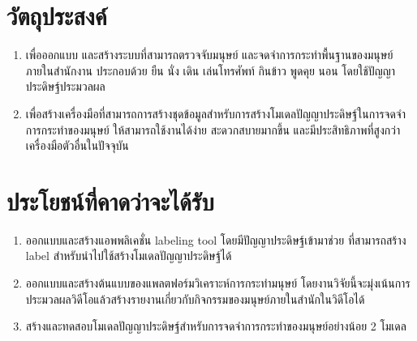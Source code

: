 \section{วัตถุประสงค์}
\begin{enumerate}
	\setlength\itemsep{-0.25em}
	\item เพื่อออกแบบ และสร้างระบบที่สามารถตรวจจับมนุษย์ และจดจำการกระทำพื้นฐานของมนุษย์ภายในสำนักงาน 
	ประกอบด้วย ยืน นั่ง เดิน เล่นโทรศัพท์ กินข้าว พูดคุย นอน โดยใช้ปัญญาประดิษฐ์ประมวลผล
	\item เพื่อสร้างเครื่องมือที่สามารถการสร้างชุดข้อมูลสำหรับการสร้างโมเดลปัญญาประดิษฐ์ในการจดจำการกระทำของมนุษย์ ให้สามารถใช้งานได้ง่าย 
	สะดวกสบายมากขึ้น และมีประสิทธิภาพที่สูงกว่าเครื่องมือตัวอื่นในปัจจุบัน
\end{enumerate}


\section{ประโยชน์ที่คาดว่าจะได้รับ}
\begin{enumerate}
	\setlength\itemsep{-0.25em}
	\item ออกแบบและสร้างแอพพลิเคชั่น labeling tool โดยมีปัญญาประดิษฐ์เข้ามาช่วย ที่สามารถสร้าง label สำหรับนำไปใช้สร้างโมเดลปัญญาประดิษฐ์ได้
	\item ออกแบบและสร้างต้นแบบของแพลตฟอร์มวิเคราะห์การกระทำมนุษย์ โดยงานวิจัยนี้จะมุ่งเน้นการประมวลผลวิดีโอแล้วสร้างรายงานเกี่ยวกับกิจกรรมของมนุษย์ภายในสำนักในวิดีโอได้
	\item สร้างและทดสอบโมเดลปัญญาประดิษฐ์สำหรับการจดจำการกระทำของมนุษย์อย่างน้อย 2 โมเดล
\end{enumerate}
\clearpage

